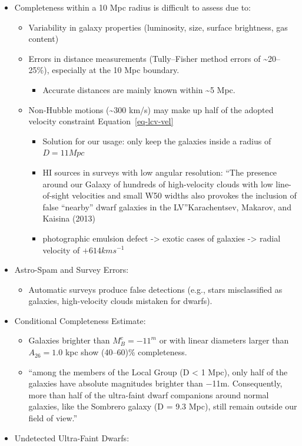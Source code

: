 \documentclass[
]{article}
\providecommand{\tightlist}{%
  \setlength{\itemsep}{0pt}\setlength{\parskip}{0pt}}\usepackage{longtable,booktabs,array}
\begin{document}
\begin{itemize}
\tightlist
\item
  Completeness within a 10 Mpc radius is difficult to assess due to:

  \begin{itemize}
  \tightlist
  \item
    Variability in galaxy properties (luminosity, size, surface
    brightness, gas content)
  \item
    Errors in distance measurements (Tully--Fisher method errors of
    \textasciitilde20--25\%), especially at the 10 Mpc boundary.

    \begin{itemize}
    \tightlist
    \item
      Accurate distances are mainly known within \textasciitilde5 Mpc.
    \end{itemize}
  \item
    Non-Hubble motions (\textasciitilde300 km/s) may make up half of the
    adopted velocity constraint Equation~\ref{eq-lcv-vel}

    \begin{itemize}
    \tightlist
    \item
      Solution for our usage: only keep the galaxies inside a radius of
      \(D=11 Mpc\)
    \item
      HI sources in surveys with low angular resolution: ``The presence
      around our Galaxy of hundreds of high-velocity clouds with low
      line-of-sight velocities and small W50 widths also provokes the
      inclusion of false ``nearby'' dwarf galaxies in the
      LV''Karachentsev, Makarov, and Kaisina (2013)
    \item
      photographic emulsion defect -\textgreater{} exotic cases of
      galaxies -\textgreater{} radial velocity of \(+614 km s^{−1}\)
    \end{itemize}
  \end{itemize}
\item
  Astro-Spam and Survey Errors:

  \begin{itemize}
  \tightlist
  \item
    Automatic surveys produce false detections (e.g., stars
    misclassified as galaxies, high-velocity clouds mistaken for
    dwarfs).
  \end{itemize}
\item
  Conditional Completeness Estimate:

  \begin{itemize}
  \tightlist
  \item
    Galaxies brighter than \(M_B^c = -11^m\) or with linear diameters
    larger than \(A_{26} = 1.0\) kpc show (40--60)\% completeness.
  \item
    ``among the members of the Local Group (D \textless{} 1 Mpc), only
    half of the galaxies have absolute magnitudes brighter than −11m.
    Consequently, more than half of the ultra-faint dwarf companions
    around normal galaxies, like the Sombrero galaxy (D = 9.3 Mpc),
    still remain outside our field of view.''
  \end{itemize}
\item
  Undetected Ultra-Faint Dwarfs:


\end{itemize}
\end{document}
